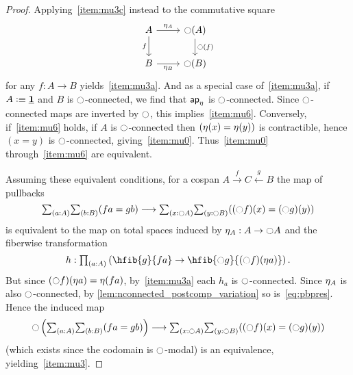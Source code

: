 \begin{proof}
  Applying~\ref{item:mu3c} instead to the commutative square
  \begin{equation}
  \begin{tikzcd}
  A \arrow[r,"{\modalunit[A]}"] \arrow[d,swap,"f"] 
    & \modal(A) \arrow[d,"\modal(f)"] \\
  B \arrow[r,swap,"{\modalunit[B]}"]
    & \modal(B)
  \end{tikzcd}
  \end{equation}
  for any $f:A\to B$ yields~\ref{item:mu3a}.
  And as a special case of~\ref{item:mu3a}, if $A\defeq \unit$ and $B$ is $\modal$-connected, we find that $\apfunc{\modalunit}$ is $\modal$-connected.
  Since $\modal$-connected maps are inverted by $\modal$, this implies~\ref{item:mu6}.
  Conversely, if~\ref{item:mu6} holds, if $A$ is $\modal$-connected then $(\modalunit(x)=\modalunit(y))$ is contractible, hence $(x=y)$ is $\modal$-connected, giving~\ref{item:mu0}.
  Thus~\ref{item:mu0} through~\ref{item:mu6} are equivalent.

  Assuming these equivalent conditions, for a cospan $A\xrightarrow{f}C \xleftarrow{g} B$ the map of pullbacks
  \begin{equation}
    \sm{a:A}{b:B} (fa=gb) \longrightarrow \sm{x:\modal A}{y:\modal B} ((\modal f)(x) = (\modal g)(y))\label{eq:pbpres}
  \end{equation}
  is equivalent to the map on total spaces induced by $\modalunit[A]:A\to\modal A$ and the fiberwise transformation
  \[ h : \prd{a:A} \left(\hfib{g}{fa} \to \hfib{\modal g}{(\modal f)(\modalunit a)}\right). \]
  But since $(\modal f)(\modalunit a) = \modalunit(fa)$, by~\ref{item:mu3a} each $h_a$ is $\modal$-connected.
  Since $\modalunit[A]$ is also $\modal$-connected, by \cref{lem:nconnected_postcomp_variation} so is~\eqref{eq:pbpres}.
  Hence the induced map
  \[ \modal\left(\sm{a:A}{b:B} (fa=gb)\right) \longrightarrow \sm{x:\modal A}{y:\modal B} ((\modal f)(x) = (\modal g)(y))\]
  (which exists since the codomain is $\modal$-modal) is an equivalence, yielding~\ref{item:mu3}.


\end{proof}
